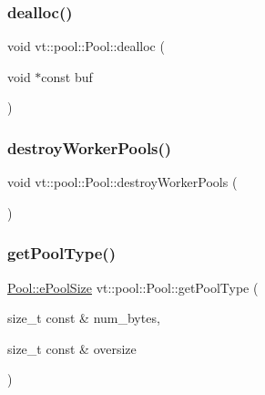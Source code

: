 \mbox{\label{structvt_1_1pool_1_1_pool_a73ef123aa04b44ae875716e2c7b95cab}} 
\subsubsection{\texorpdfstring{dealloc()}{dealloc()}}
{\footnotesize\ttfamily void vt\+::pool\+::\+Pool\+::dealloc (\begin{DoxyParamCaption}\item[{void $\ast$const}]{buf }\end{DoxyParamCaption})}

\mbox{\label{structvt_1_1pool_1_1_pool_a7667904b82ae8b830a6038e8bbf4939d}} 
\subsubsection{\texorpdfstring{destroy\+Worker\+Pools()}{destroyWorkerPools()}}
{\footnotesize\ttfamily void vt\+::pool\+::\+Pool\+::destroy\+Worker\+Pools (\begin{DoxyParamCaption}{ }\end{DoxyParamCaption})}

\mbox{\label{structvt_1_1pool_1_1_pool_a9aa5afbbea5a61265746c4d461502d62}} 
\subsubsection{\texorpdfstring{get\+Pool\+Type()}{getPoolType()}}
{\footnotesize\ttfamily \hyperlink{structvt_1_1pool_1_1_pool_ace8d36439e5e599a8ee68b2f1a6a6b28}{Pool\+::e\+Pool\+Size} vt\+::pool\+::\+Pool\+::get\+Pool\+Type (\begin{DoxyParamCaption}\item[{size\+\_\+t const \&}]{num\+\_\+bytes,  }\item[{size\+\_\+t const \&}]{oversize }\end{DoxyParamCaption})}


